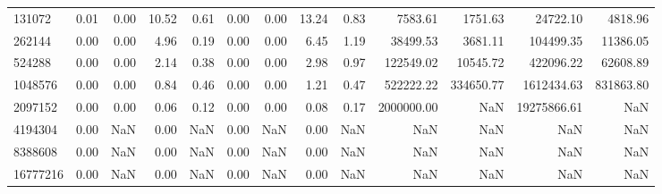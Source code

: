 \begin{tabular}{lrrrrrrrrrrrr}
131072 & 0.01 & 0.00 & 10.52 & 0.61 & 0.00 & 0.00 & 13.24 & 0.83 & 7583.61 & 1751.63 & 24722.10 & 4818.96 \\
262144 & 0.00 & 0.00 & 4.96 & 0.19 & 0.00 & 0.00 & 6.45 & 1.19 & 38499.53 & 3681.11 & 104499.35 & 11386.05 \\
524288 & 0.00 & 0.00 & 2.14 & 0.38 & 0.00 & 0.00 & 2.98 & 0.97 & 122549.02 & 10545.72 & 422096.22 & 62608.89 \\
1048576 & 0.00 & 0.00 & 0.84 & 0.46 & 0.00 & 0.00 & 1.21 & 0.47 & 522222.22 & 334650.77 & 1612434.63 & 831863.80 \\
2097152 & 0.00 & 0.00 & 0.06 & 0.12 & 0.00 & 0.00 & 0.08 & 0.17 & 2000000.00 & NaN & 19275866.61 & NaN \\
4194304 & 0.00 & NaN & 0.00 & NaN & 0.00 & NaN & 0.00 & NaN & NaN & NaN & NaN & NaN \\
8388608 & 0.00 & NaN & 0.00 & NaN & 0.00 & NaN & 0.00 & NaN & NaN & NaN & NaN & NaN \\
16777216 & 0.00 & NaN & 0.00 & NaN & 0.00 & NaN & 0.00 & NaN & NaN & NaN & NaN & NaN \\
\bottomrule
\end{tabular}
